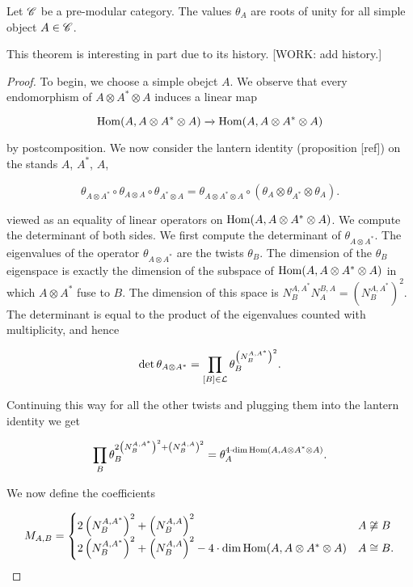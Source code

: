 \begin{theorem}[Vafa] Let $\mathscr{C}$ be a pre-modular category. The values $\theta_{A}$ are roots of unity for all simple object $A\in \mathscr{C}$.
\end{theorem}
\begin{remark} This theorem is interesting in part due to its history. [WORK: add history.]
\end{remark}
\begin{proof} To begin, we choose a simple obejct $A$. We observe that every endomorphism of $A\otimes A^*\otimes A$ induces a linear map

$$\operatorname{Hom}(A,A\otimes A^*\otimes A) \xrightarrow{} \operatorname{Hom}(A,A\otimes A^*\otimes A)$$

by postcomposition. We now consider the lantern identity (proposition [ref]) on the stands $A$, $A^*$, $A$,

$$\theta_{A\otimes A^*}\circ \theta_{A\otimes A}\circ \theta_{A^*\otimes A} = \theta_{A\otimes A^*\otimes A}\circ (\theta_{A}\otimes \theta_{A^*}\otimes \theta_{A}).$$

viewed as an equality of linear operators on $\operatorname{Hom}(A,A\otimes A^*\otimes A)$. We compute the determinant of both sides. We first compute the determinant of $\theta_{A\otimes A^*}$. The eigenvalues of the operator $\theta_{A\otimes A^*}$ are the twists $\theta_{B}$. The dimension of the $\theta_{B}$ eigenspace is exactly the dimension of the subspace of $\operatorname{Hom}(A,A\otimes A^*\otimes A)$ in which $A\otimes A^*$ fuse to $B$. The dimension of this space is $N^{A,A^*}_{B}N^{B,A}_{A}=(N^{A,A^*}_{B})^2$. The determinant is equal to the product of the eigenvalues counted with multiplicity, and hence

$$\det \theta_{A\otimes A^*}= \prod_{[B]\in \mathcal{L}}\theta_{B}^{\left(N^{A,A^*}_{B}\right)^2}.$$

Continuing this way for all the other twists and plugging them into the lantern identity we get

$$\prod_{B}\theta_{B}^{2\left(N^{A,A^*}_{B}\right)^2+\left(N^{A,A}_{B}\right)^2}=\theta_{A}^{4\cdot \dim \operatorname{Hom}(A,A\otimes A^*\otimes A)}.$$

We now define the coefficients

$$
M_{A,B}=
\begin{cases}
2\left(N^{A,A^*}_{B}\right)^2+\left(N^{A,A}_{B}\right)^2 & A\not\cong B\\
2\left(N^{A,A^*}_{B}\right)^2+\left(N^{A,A}_{B}\right)^2 - 4\cdot \dim \operatorname{Hom}(A,A\otimes A^*\otimes A) & A\cong B.
\end{cases}
$$


\end{proof}
